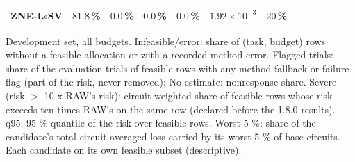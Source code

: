 \begin{table}[p]
\begin{tabular}{lrrrrrr}
ZNE-L$\circ$SV & $81.8$\,\% & $0.0$\,\% & $0.0$\,\% & $0.0$\,\% & $1.92\times10^{-3}$ & $20$\,\% \\
\bottomrule
\end{tabular}
\par\vspace{0.5em}
\begin{minipage}{0.97\linewidth}
\footnotesize Development set, all budgets. Infeasible/error: share of (task, budget) rows without a feasible allocation or with a recorded method error. Flagged trials: share of the evaluation trials of feasible rows with any method fallback or failure flag (part of the risk, never removed); No estimate: nonresponse share. Severe (risk $>$ 10 x RAW's risk): circuit-weighted share of feasible rows whose risk exceeds ten times RAW's on the same row (declared before the 1.8.0 results). q95: 95 \% quantile of the risk over feasible rows. Worst 5 \%: share of the candidate's total circuit-averaged loss carried by its worst 5 \% of base circuits. Each candidate on its own feasible subset (descriptive).
\end{minipage}
\end{table}
